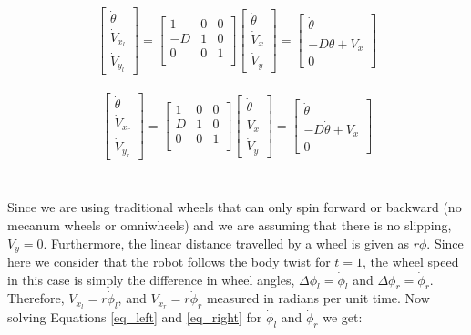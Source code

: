 \documentclass{article}
\begin{document}
\begin{gather}
   \label{eq_left}
    \begin{bmatrix} \dot \theta \\ \dot V_{x_l} \\ \dot V_{y_l} \end{bmatrix}
        =
        \begin{bmatrix}
            1 & 0 & 0 \\
            -D & 1 & 0 \\
            0 & 0 & 1 \\
        \end{bmatrix}
        \begin{bmatrix} \dot \theta \\ \dot V_x \\ \dot V_y \end{bmatrix}
        =
    \begin{bmatrix} \dot \theta \\ -D \dot \theta + V_x \\ 0 \end{bmatrix}
\end{gather}

\begin{gather}
   \label{eq_right}
    \begin{bmatrix} \dot \theta \\ \dot V_{x_r} \\ \dot V_{y_r} \end{bmatrix}
        =
        \begin{bmatrix}
            1 & 0 & 0 \\
            D & 1 & 0 \\
            0 & 0 & 1 \\
        \end{bmatrix}
        \begin{bmatrix} \dot \theta \\ \dot V_x \\ \dot V_y \end{bmatrix}
        =
    \begin{bmatrix} \dot \theta \\ -D \dot \theta + V_x \\ 0 \end{bmatrix}
\end{gather}
\\
\\
\noindent
Since we are using traditional wheels that can only spin
forward or backward (no mecanum wheels or omniwheels) and we
are assuming that there is no slipping, $V_y = 0$. Furthermore,
the linear distance travelled by a wheel is given as $r \phi$. Since
here we consider that the robot follows the body twist for $t = 1$,
the wheel speed in this case is simply the difference in wheel angles,
$\Delta \phi_l = \dot \phi_l$ and $\Delta \phi_r = \dot \phi_r$.
Therefore, $V_{x_l} = r \dot \phi_l $, and $V_{x_r} = r \dot \phi_r$ measured
in radians per unit time.
Now solving Equations
\ref{eq_left} and \ref{eq_right} for $\dot \phi_l$ and $\dot \phi_r$
we get:
\end{document}
